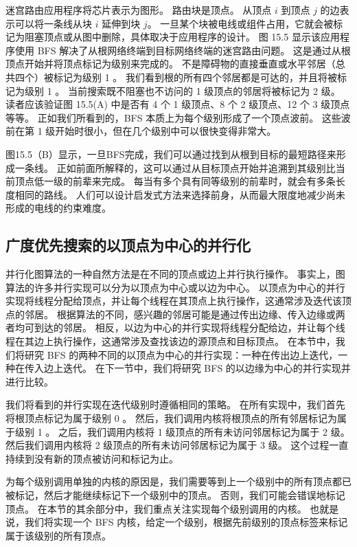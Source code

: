 迷宫路由应用程序将芯片表示为图形。 路由块是顶点。 从顶点 $i$ 到顶点 $j$ 的边表示可以将一条线从块 $i$ 延伸到块 $j$。 
一旦某个块被电线或组件占用，它就会被标记为阻塞顶点或从图中删除，具体取决于应用程序的设计。 
图 15.5 显示该应用程序使用 BFS 解决了从根网络终端到目标网络终端的迷宫路由问题。 
这是通过从根顶点开始并将顶点标记为级别来完成的。 不是障碍物的直接垂直或水平邻居（总共四个）被标记为级别 1 。 
我们看到根的所有四个邻居都是可达的，并且将被标记为级别 1 。 当前搜索既不阻塞也不访问的 1 级顶点的邻居将被标记为 2 级。 
读者应该验证图 15.5(A) 中是否有 4 个 1 级顶点、8 个 2 级顶点、12 个 3 级顶点等等。 
正如我们所看到的，BFS 本质上为每个级别形成了一个顶点波前。 这些波前在第 1 级开始时很小，但在几个级别中可以很快变得非常大。

图15.5（B）显示，一旦BFS完成，我们可以通过找到从根到目标的最短路径来形成一条线。 
正如前面所解释的，这可以通过从目标顶点开始并追溯到其级别比当前顶点低一级的前辈来完成。 
每当有多个具有同等级别的前辈时，就会有多条长度相同的路线。 
人们可以设计启发式方法来选择前身，从而最大限度地减少尚未形成的电线的约束难度。

\subsection{广度优先搜索的以顶点为中心的并行化}
并行化图算法的一种自然方法是在不同的顶点或边上并行执行操作。 事实上，图算法的许多并行实现可以分为以顶点为中心或以边为中心。 
以顶点为中心的并行实现将线程分配给顶点，并让每个线程在其顶点上执行操作，这通常涉及迭代该顶点的邻居。 
根据算法的不同，感兴趣的邻居可能是通过传出边缘、传入边缘或两者均可到达的邻居。 
相反，以边为中心的并行实现将线程分配给边，并让每个线程在其边上执行操作，这通常涉及查找该边的源顶点和目标顶点。 
在本节中，我们将研究 BFS 的两种不同的以顶点为中心的并行实现：一种在传出边上迭代，一种在传入边上迭代。 
在下一节中，我们将研究 BFS 的以边缘为中心的并行实现并进行比较。

我们将看到的并行实现在迭代级别时遵循相同的策略。 在所有实现中，我们首先将根顶点标记为属于级别 0 。 
然后，我们调用内核将根顶点的所有邻居标记为属于级别 1 。 之后，我们调用内核将 1 级顶点的所有未访问邻居标记为属于 2 级。 
然后我们调用内核将 2 级顶点的所有未访问邻居标记为属于 3 级。 这个过程一直持续到没有新的顶点被访问和标记为止。

为每个级别调用单独的内核的原因是，我们需要等到上一个级别中的所有顶点都已被标记，然后才能继续标记下一个级别中的顶点。 
否则，我们可能会错误地标记顶点。 在本节的其余部分中，我们重点关注实现每个级别调用的内核。 
也就是说，我们将实现一个 BFS 内核，给定一个级别，根据先前级别的顶点标签来标记属于该级别的所有顶点。

